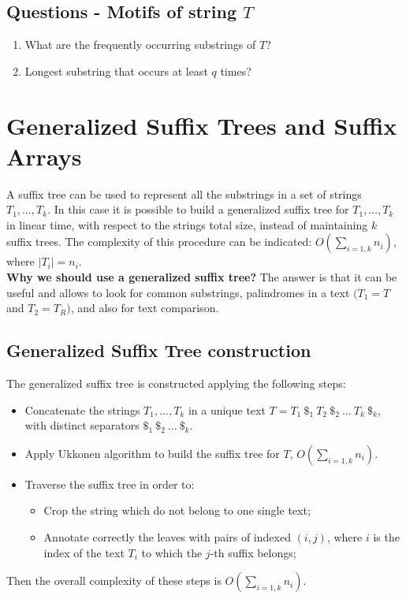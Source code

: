 \subsection{Questions - Motifs of string $T$}
\begin{enumerate}
	\item What are the frequently occurring substrings of $T$?
	\item Longest substring that occurs at least $q$ times? 
\end{enumerate}


\section{Generalized Suffix Trees and Suffix Arrays}
A suffix tree can be used to represent all the substrings in a set of strings $T_1, \dots, T_k$. In this case it is possible to build a generalized suffix tree for $T_1, \dots, T_k$ in linear time, with respect to the strings total size, instead of maintaining $k$ suffix trees.
The complexity of this procedure can be indicated: $O(\sum_{i = 1,k}n_i)$, where $|T_i| = n_i$.\\
\textbf{Why we should use a generalized suffix tree?} The answer is that it can be useful and allows to look for common substrings, palindromes in a text $(T_1 = T$ and $T_2 = T_R)$, and also for text comparison.

\subsection{Generalized Suffix Tree construction}
The generalized suffix tree is constructed applying the following steps:
\begin{itemize}
	\item Concatenate the strings $T_1,\dots,T_k$ in a unique text $T = T_1~ \$_1 ~T_2 ~\$_2 ~\dots ~T_k~\$_k$, with distinct separators $\$_1 ~ \$_2 ~\dots ~\$_k$.
	
	\item Apply Ukkonen algorithm to build the suffix tree for $T$, $O(\sum_{i = 1,k}n_i)$.
	
	\item Traverse the suffix tree in order to:
	\begin{itemize}
		\item Crop the string which do not belong to one single text;
		\item Annotate correctly the leaves with pairs of indexed $(i,j)$, where $i$ is the index of the text $T_i$ to which the $j$-th suffix belongs;
	\end{itemize}
\end{itemize} 
Then the overall complexity of these steps is $O(\sum_{i = 1,k}n_i)$.\\

